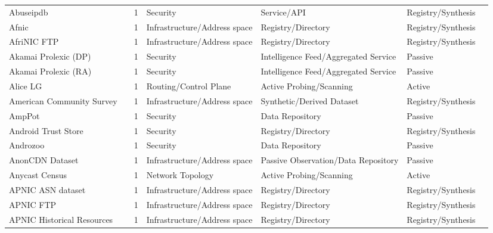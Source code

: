 \begin{table}[h!]
\begin{tabular}{lllllll}
Abuseipdb & \cite{abuseipdb} & 1 & Security & Service/API & Registry/Synthesis & \cite{10.1145/3777912.3839790} \\
Afnic & \cite{afnic} & 1 & Infrastructure/Address space & Registry/Directory & Registry/Synthesis & \cite{10.1007/978-3-031-85960-1_5} \\
AfriNIC FTP & \cite{afrinic_ftp} & 1 & Infrastructure/Address space & Registry/Directory & Registry/Synthesis & \cite{10.1145/3487552.3487838} \\
Akamai Prolexic (DP) & \cite{akamai_prolexic} & 1 & Security & Intelligence Feed/Aggregated Service & Passive & \cite{10.1145/3646547.3688451} \\
Akamai Prolexic (RA) & \cite{akamai_prolexic} & 1 & Security & Intelligence Feed/Aggregated Service & Passive & \cite{10.1145/3646547.3688451} \\
Alice LG & \cite{alice_lg} & 1 & Routing/Control Plane & Active Probing/Scanning & Active & \cite{10.1007/978-3-031-56252-5_10} \\
American Community Survey & \cite{american_community_survey} & 1 & Infrastructure/Address space & Synthetic/Derived Dataset & Registry/Synthesis & \cite{10.1145/3517745.3561460} \\
AmpPot & \cite{amppot} & 1 & Security & Data Repository & Passive & \cite{10.1145/3646547.3688451} \\
Android Trust Store & \cite{android_trust_store} & 1 & Security & Registry/Directory & Registry/Synthesis & \cite{10.1007/978-3-031-28486-1_4} \\
Androzoo & \cite{androzoo} & 1 & Security & Data Repository & Passive & \cite{10.1145/3646547.3688405} \\
AnonCDN Dataset & \cite{anoncdn_dataset} & 1 & Infrastructure/Address space & Passive Observation/Data Repository & Passive & \cite{10.1145/3646547.3688411} \\
Anycast Census & \cite{anycast_census} & 1 & Network Topology & Active Probing/Scanning & Active & \cite{10.1007/978-3-031-56252-5_1} \\
APNIC ASN dataset & \cite{apnic_asn} & 1 & Infrastructure/Address space & Registry/Directory & Registry/Synthesis & \cite{10.1145/3487552.3487854} \\
APNIC FTP & \cite{apnic_ftp} & 1 & Infrastructure/Address space & Registry/Directory & Registry/Synthesis & \cite{10.1145/3487552.3487838} \\
APNIC Historical Resources & \cite{apnic_erx} & 1 & Infrastructure/Address space & Registry/Directory & Registry/Synthesis & \cite{10.1145/3487552.3487838} \\

\end{tabular}
\end{table}
